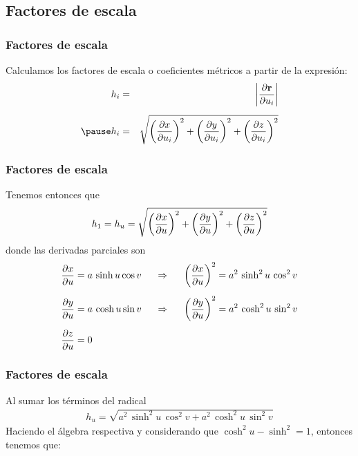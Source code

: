 \documentclass[12pt]{beamer}
\begin{document}
\subsection{Factores de escala}
\begin{frame}
\frametitle{Factores de escala}
Calculamos los factores de escala o coeficientes métricos a partir de la expresión:
\begin{eqnarray*}
h_{i} &=& \abs{\pdv{\vb{r}}{u_{i}}} \\[0.5em]
\pause
h_{i} &=& \sqrt{ \left( \pdv{x}{u_{i}} \right)^{2} + \left( \pdv{y}{u_{i}} \right)^{2} + \left( \pdv{z}{u_{i}} \right)^{2}}
\end{eqnarray*}
\end{frame}
\begin{frame}
\frametitle{Factores de escala}
Tenemos entonces que
\begin{align*}
h_{1} = h_{u} = \sqrt{ \left( \pdv{x}{u} \right)^{2} + \left( \pdv{y}{u} \right)^{2} + \left( \pdv{z}{u} \right)^{2}}
\end{align*}
\pause
donde las derivadas parciales son
\fontsize{12}{12}\selectfont
\begin{align*}
\pdv{x}{u} &= a \, \sinh u \cos v \hspace{0.5cm} \Rightarrow \hspace{0.5cm} \left( \pdv{x}{u} \right)^{2} = a^{2} \, \sinh^{2} u \, \cos^{2} v \\[0.5em]
\pdv{y}{u} &= a \, \cosh u \sin v \hspace{0.5cm} \Rightarrow \hspace{0.5cm} \left( \pdv{y}{u} \right)^{2} = a^{2} \, \cosh^{2} u \, \sin^{2} v \\[0.5em]
\pdv{z}{u} &= 0
\end{align*}
\end{frame}
\begin{frame}
\frametitle{Factores de escala}
Al sumar los términos del radical
\begin{align*}
h_{u} = \sqrt{a^{2} \, \sinh^{2} u \, \cos^{2} v + a^{2} \, \cosh^{2} u \, \sin^{2} v}
\end{align*}
Haciendo el álgebra respectiva y considerando que $\cosh^{2} u - \sinh^{2} = 1$, entonces tenemos que:
\end{frame}
\end{document}

